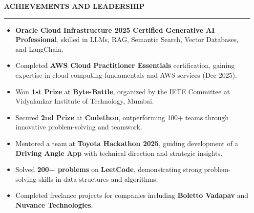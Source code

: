\documentclass[letterpaper,10pt]{article}
\newcommand{\sectionheader}[1]{%
    \vspace{3pt}
    \noindent\textbf{\large #1}
    \rule{\linewidth}{0.4pt}
    \vspace{-2pt}
}
\begin{document}
\sectionheader{ACHIEVEMENTS AND LEADERSHIP}
\begin{itemize}[leftmargin=*,label=\textbullet, noitemsep, topsep=0pt, partopsep=0pt]
    \item \textbf{Oracle Cloud Infrastructure 2025 Certified Generative AI Professional}, skilled in LLMs, RAG, Semantic Search, Vector Databases, and LangChain.
    \item Completed \textbf{AWS Cloud Practitioner Essentials} certification, gaining expertise in cloud computing fundamentals and AWS services (Dec 2025).
    \item Won \textbf{1st Prize} at \textbf{Byte-Battle}, organized by the IETE Committee at Vidyalankar Institute of Technology, Mumbai.
    \item Secured \textbf{2nd Prize} at \textbf{Codethon}, outperforming 100+ teams through innovative problem-solving and teamwork.
    \item Mentored a team at \textbf{Toyota Hackathon 2025}, guiding development of a \textbf{Driving Angle App} with technical direction and strategic insights.
    \item Solved \textbf{200+ problems} on \textbf{LeetCode}, demonstrating strong problem-solving skills in data structures and algorithms.
    \item Completed freelance projects for companies including \textbf{Boletto Vadapav} and \textbf{Nuvance Technologies}.
\end{itemize}
\end{document}
